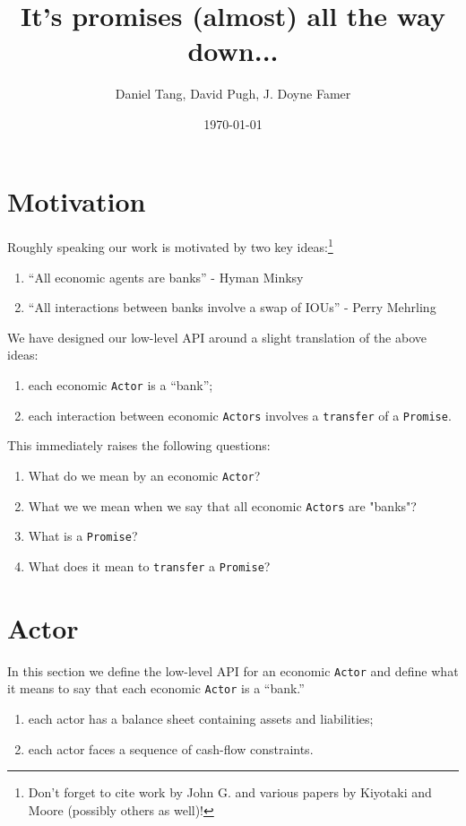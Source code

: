 \documentclass[a4paper]{article}
\title{It's promises (almost) all the way down...}
\date{\today}
\author{Daniel Tang, David Pugh, J. Doyne Famer}
\begin{document}
\maketitle


\section{Motivation}
Roughly speaking our work is motivated by two key ideas:\footnote{
%
Don't forget to cite work by John G. and various papers by Kiyotaki and Moore (possibly others as well)!
%
} 
\begin{enumerate}
	\item ``All economic agents are banks'' - Hyman Minksy
	\item ``All interactions between banks involve a swap of IOUs'' - Perry Mehrling
\end{enumerate}
We have designed our low-level API around a slight translation of the above ideas:
\begin{enumerate}
	\item each economic \texttt{Actor} is a ``bank'';
	\item each interaction between economic \texttt{Actors} involves a \texttt{transfer} of a \texttt{Promise}.
\end{enumerate}

This immediately raises the following questions:
\begin{enumerate}
	\item What do we mean by an economic \texttt{Actor}?
	\item What we we mean when we say that all economic \texttt{Actors} are "banks"?
	\item What is a \texttt{Promise}?
	\item What does it mean to \texttt{transfer} a \texttt{Promise}?
\end{enumerate}

\section{Actor}
In this section we define the low-level API for an economic \texttt{Actor} and define what it means to say that each economic \texttt{Actor} is a ``bank.''

\begin{enumerate}
	\item each actor has a balance sheet containing assets and liabilities;
	\item each actor faces a sequence of cash-flow constraints.
\end{enumerate}
\end{document}
